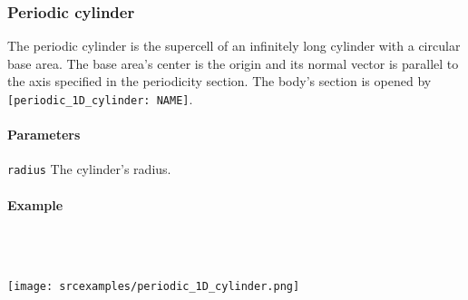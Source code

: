 \subsubsection{Periodic cylinder}
The periodic cylinder is the supercell of an infinitely long cylinder with a circular base area. The base area's center is the origin and its normal vector is parallel to the axis specified in the periodicity section. The body's section is opened by \lstinline{[periodic_1D_cylinder: NAME]}.

\paragraph{Parameters}
\begin{description}
 \item{\lstinline{radius}} The cylinder's radius.
\end{description}

\paragraph{Example}\ 


\ \\\texttt{[image: srcexamples/periodic\_1D\_cylinder.png]}